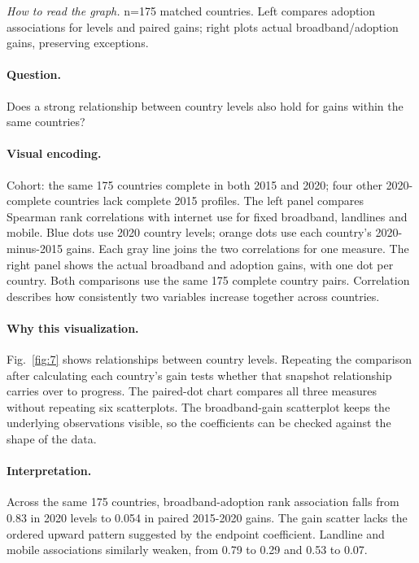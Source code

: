 \documentclass[conference,a4paper]{IEEEtran}
\begin{document}
\noindent\textit{How to read the graph.} n=175 matched countries. Left compares adoption associations for levels and paired gains; right plots actual broadband/adoption gains, preserving exceptions.

\paragraph{Question.} Does a strong relationship between country levels also hold for gains within the same countries?



\paragraph{Visual encoding.} Cohort: the same 175 countries complete in both 2015 and 2020; four other 2020-complete countries lack complete 2015 profiles. The left panel compares Spearman rank correlations with internet use for fixed broadband, landlines and mobile. Blue dots use 2020 country levels; orange dots use each country's 2020-minus-2015 gains. Each gray line joins the two correlations for one measure. The right panel shows the actual broadband and adoption gains, with one dot per country. Both comparisons use the same 175 complete country pairs. Correlation describes how consistently two variables increase together across countries.



\paragraph{Why this visualization.} Fig.~\ref{fig:7} shows relationships between country levels. Repeating the comparison after calculating each country's gain tests whether that snapshot relationship carries over to progress. The paired-dot chart compares all three measures without repeating six scatterplots. The broadband-gain scatterplot keeps the underlying observations visible, so the coefficients can be checked against the shape of the data.



\paragraph{Interpretation.} Across the same 175 countries, broadband-adoption rank association falls from 0.83 in 2020 levels to 0.054 in paired 2015-2020 gains. The gain scatter lacks the ordered upward pattern suggested by the endpoint coefficient. Landline and mobile associations similarly weaken, from 0.79 to 0.29 and 0.53 to 0.07.
\end{document}
